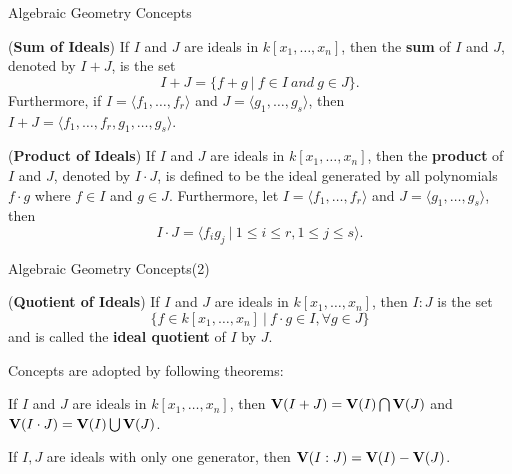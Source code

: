 \documentclass[xcolor=dvipsnames]{beamer}
\begin{document}
\begin{frame}{\large{Algebraic Geometry Concepts}}
\begin{Definition}
\label{def:sum}
({\bf Sum of Ideals}) If $I$ and $J$ are ideals in $k[x_1, \dots, x_n]$, then the 
{\bf sum} of $I$ and $J$, denoted by $I + J$, is the set
  \begin{equation}
  I + J = \{f + g\ |\ f \in I \ and\  g \in J\}.\nonumber
  \end{equation}
Furthermore, if $I = \langle f_1, \dots, f_r\rangle$ and 
$J = \langle g_1, \dots, g_s\rangle$, then 
$I + J = \langle f_1, \dots, f_r, g_1, \dots, g_s\rangle$.
\end{Definition}
\begin{Definition}
\label{def:prod}
({\bf Product of Ideals}) If $I$ and $J$ are ideals in $k[x_1, \dots, x_n]$, then the
{\bf product} of $I$ and $J$, denoted by $I \cdot J$, is defined to be the ideal generated 
by all polynomials $f \cdot g$ where $f \in I$ and $g \in J$. Furthermore, let
$I = \langle f_1, \dots, f_r\rangle$ and $J = \langle g_1, \dots, g_s\rangle$, then
  \begin{equation}
  I \cdot J = \langle f_ig_j\ |\ 1 \leq i \leq r, 1 \leq j \leq s\rangle .\nonumber
  \end{equation}
\end{Definition}
\end{frame}

\begin{frame}{\large{Algebraic Geometry Concepts(2)}}
\begin{Definition}
({\bf Quotient of Ideals}) If $I$ and $J$ are ideals in $k[x_1, \dots, x_n]$, then $I:J$
is the set
  \begin{equation}
  \{f \in k[x_1, \dots, x_n]\ |\ f\cdot g \in I, \forall g \in J\}\nonumber
  \end{equation}
and is called the {\bf ideal quotient} of $I$ by $J$.
\end{Definition}
\vspace{5mm}
Concepts are adopted by following theorems:
\begin{Theorem}
\label{thm:unionintersect}
If $I$ and $J$ are ideals in $k[x_1, \dots, x_n]$, then ${\bf V}(I + J) = {\bf V}(I)
\bigcap {\bf V}(J)$ and ${\bf V}(I \cdot J) = {\bf V}(I) \bigcup {\bf V}(J)$.
\end{Theorem}
\begin{Theorem}
\label{thm:quotient}
If $I, J$ are ideals with only one generator, then ${\bf V}(I:J) ={\bf V}(I) - {\bf V}(J)$.
\end{Theorem}
\end{frame}
\end{document}
